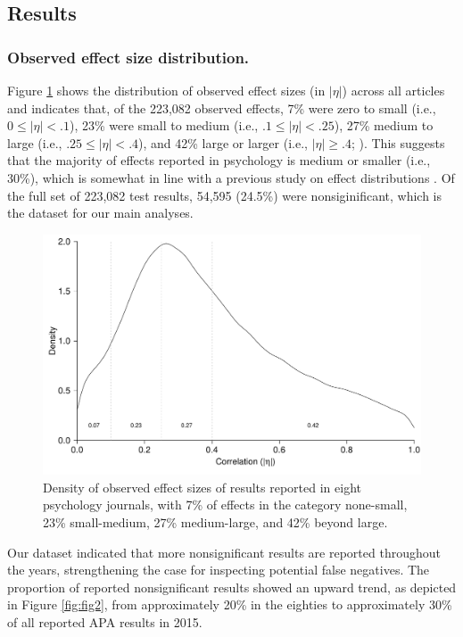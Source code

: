 \documentclass{article}
\begin{document}
\subsection*{Results}

\subsubsection*{Observed effect size distribution.}


Figure \ref{fig:fig1} shows the distribution of observed effect sizes (in $|\eta|$) across all articles and indicates that, of the 223,082 observed effects, 7\% were zero to small (i.e., $0\leq|\eta|<.1$), 23\% were small to medium (i.e., $.1\leq|\eta|<.25$), 27\% medium to large (i.e., $.25\leq|\eta|<.4$), and 42\% large or larger (i.e., $|\eta|\geq.4$; \cite{Cohen1988-wg}). This suggests that the majority of effects reported in psychology is medium or smaller (i.e., 30\%), which is somewhat in line with a previous study on effect distributions \cite{Gignac2016-je}. Of the full set of 223,082 test results, 54,595 (24.5\%) were nonsiginificant, which is the dataset for our main analyses.

\begin{figure}
\begin{center}
\includegraphics{../figures/Fig1.pdf}
\end{center}
\caption{Density of observed effect sizes of results reported in eight psychology journals, with 7\% of effects in the category none-small, 23\% small-medium, 27\% medium-large, and 42\% beyond large.}
\label{fig:fig1}
\end{figure}

Our dataset indicated that more nonsignificant results are reported throughout the years, strengthening the case for inspecting potential false negatives. The proportion of reported nonsignificant results showed an upward trend, as depicted in Figure \ref{fig:fig2}, from approximately 20\% in the eighties to approximately 30\% of all reported APA results in 2015.
\end{document}
